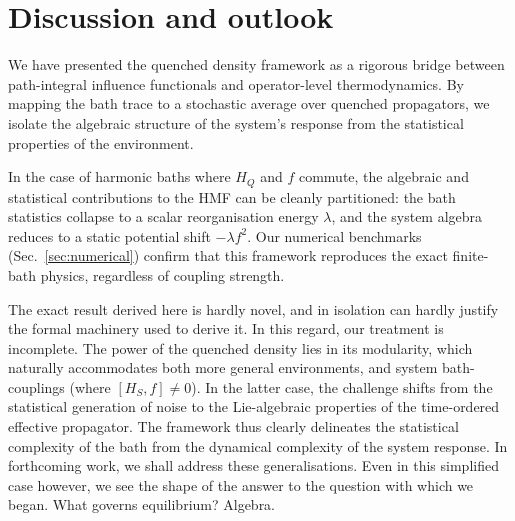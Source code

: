 \section{Discussion and outlook}
\label{sec:discussion}

We have presented the quenched density framework as a rigorous bridge between path-integral influence functionals and operator-level thermodynamics. By mapping the bath trace to a stochastic average over quenched propagators, we isolate the algebraic structure of the system's response from the statistical properties of the environment.

In the case of harmonic baths where $H_Q$ and $f$ commute, the algebraic and statistical contributions to the HMF can be cleanly partitioned: the bath statistics collapse to a scalar reorganisation energy $\lambda$, and the system algebra reduces to a static potential shift $-\lambda f^2$. Our numerical benchmarks (Sec.~\ref{sec:numerical}) confirm that this framework reproduces the exact finite-bath physics, regardless of coupling strength.

The exact result derived here is hardly novel, and in isolation can hardly justify the formal machinery used to derive it. In this regard, our treatment is incomplete. The power of the quenched density lies in its modularity, which naturally accommodates both more general environments, and system bath-couplings (where $[H_S, f] \neq 0$). In the latter case, the challenge shifts from the statistical generation of noise to the Lie-algebraic properties of the time-ordered effective propagator. The framework thus clearly delineates the statistical complexity of the bath from the dynamical complexity of the system response. In forthcoming work, we shall address these generalisations. Even in this simplified case however, we see the shape of the answer to the question with which we began. What governs equilibrium? Algebra. 
